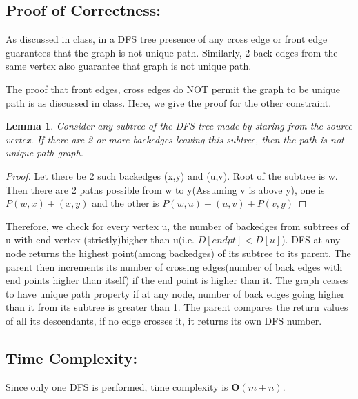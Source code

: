 \documentclass{article}
\newtheorem{lemma}{Lemma}
\begin{document}
\subsection{Proof of Correctness:}
As discussed in class, in a DFS tree presence of any cross edge or front edge guarantees that the graph is not unique path. Similarly, 2 back edges from the same vertex also guarantee that graph is not unique path.

The proof that front edges, cross edges do NOT permit the graph to be unique path is as discussed in class. Here, we give the proof for the other constraint.

\begin{lemma}
	Consider any subtree of the DFS tree made by staring from the source vertex. If there are 2 or more backedges leaving this subtree, then the path is not unique path graph.
\end{lemma}
\begin{proof}
	Let there be 2 such backedges (x,y) and (u,v). Root of the subtree is w. Then there are 2 paths possible from w to y(Assuming v is above y), one is $P(w,x) + (x,y)$ and the other is $P(w,u) + (u,v) + P(v,y)$
\end{proof}

Therefore, we check for every vertex u, the number of backedges from subtrees of u with end vertex (strictly)higher than u(i.e. $D[endpt] < D[u]$). DFS at any node returns the highest point(among backedges) of its subtree to its parent. The parent then increments its number of crossing edges(number of back edges with end points higher than itself) if the end point is higher than it. The graph ceases to have unique path property if at any node, number of back edges going higher than it from its subtree is greater than 1. The parent compares the return values of all its descendants, if no edge crosses it, it returns its own DFS number.

\subsection{Time Complexity:}
Since only one DFS is performed, time complexity is $\mathbf{O}(m+n)$.
\end{document}
